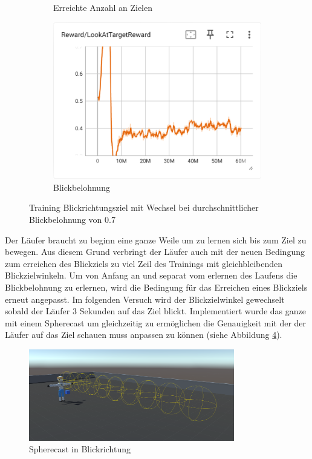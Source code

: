 \begin{figure}[H]
\begin{subfigure}{.49\textwidth}
      \caption{Erreichte Anzahl an Zielen}
      \label{fig:113_reach_target}
    \end{subfigure}
    \begin{subfigure}{.49\textwidth}
      \centering  
      \includegraphics[width=\textwidth]{img/113_look_reward}
      \caption{Blickbelohnung}
      \label{fig:113_look_reward}
    \end{subfigure}
  \caption{Training Blickrichtungsziel mit Wechsel bei durchschnittlicher Blickbelohnung von 0.7}
  \label{fig:training_blickrichtungsziel_wechsel_07}
\end{figure}

Der Läufer braucht zu beginn eine ganze Weile um zu lernen sich bis zum Ziel zu bewegen. Aus diesem Grund verbringt der Läufer auch mit der neuen Bedingung zum erreichen des Blickziels zu viel Zeil des Trainings mit gleichbleibenden Blickzielwinkeln. Um von Anfang an und separat vom erlernen des Laufens die Blickbelohnung zu erlernen, wird die Bedingung für das Erreichen eines Blickziels erneut angepasst. Im folgenden Versuch wird der Blickzielwinkel gewechselt sobald der Läufer 3 Sekunden auf das Ziel blickt. Implementiert wurde das ganze mit einem Spherecast um gleichzeitig zu ermöglichen die Genauigkeit mit der der Läufer auf das Ziel schauen muss anpassen zu können (siehe Abbildung \ref{fig:spherecast}).

\begin{figure}[H]
  \centering  
  \includegraphics[width=0.8\textwidth]{img/spherecast}
  \caption{Spherecast in Blickrichtung}
  \label{fig:spherecast}
\end{figure}

